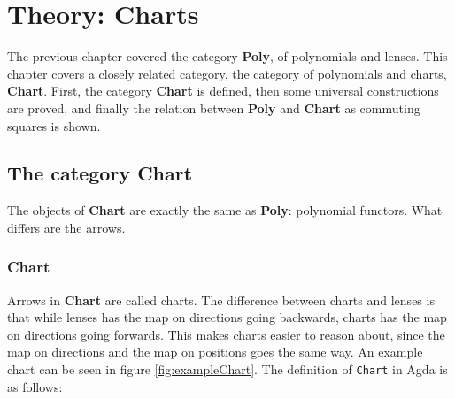 \chapter{Theory: Charts}\label{chapter:charts}
The previous chapter covered the category \textbf{Poly}, of polynomials and lenses. This chapter covers a closely related category, the category of polynomials and charts, \textbf{Chart}. First, the category \textbf{Chart} is defined, then some universal constructions are proved, and finally the relation between \textbf{Poly} and \textbf{Chart} as commuting squares is shown.

\section{The category \textbf{Chart}}
The objects of \textbf{Chart} are exactly the same as \textbf{Poly}: polynomial functors. What differs are the arrows. 

\subsection{Chart}
Arrows in \textbf{Chart} are called charts. The difference between charts and lenses is that while lenses has the map on directions going backwards, charts has the map on directions going forwards. This makes charts easier to reason about, since the map on directions and the map on positions goes the same way. An example chart can be seen in figure \ref{fig:exampleChart}. The definition of \texttt{Chart} in Agda is as follows:


